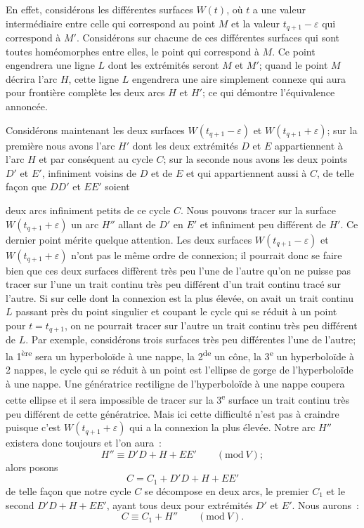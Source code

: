 \documentclass{article}
\begin{document}
En effet, considérons les différentes surfaces $W(t)$, où $t$ a une valeur intermédiaire entre celle qui correspond au point $M$ et la valeur $t_{q+1} - \varepsilon$ qui correspond à $M'$. Considérons sur chacune de ces différentes surfaces qui sont toutes homéomorphes entre elles, le point qui correspond à $M$. Ce point engendrera une ligne $L$ dont les extrémités seront $M$ et $M'$; quand le point $M$ décrira l'arc $H$, cette ligne $L$ engendrera une aire simplement connexe qui aura pour frontière complète les deux arcs $H$ et $H'$; ce qui démontre l'équivalence annoncée.

Considérons maintenant les deux surfaces $W(t_{q+1} - \varepsilon)$ et $W(t_{q+1} + \varepsilon)$; sur la première nous avons l'arc $H'$ dont les deux extrémités $D$ et $E$ appartiennent à l'arc $H$ et par conséquent au cycle $C$; sur la seconde nous avons les deux points $D'$ et $E'$, infiniment voisins de $D$ et de $E$ et qui appartiennent aussi à $C$, de telle façon que $DD'$ et $EE'$ soient

deux arcs infiniment petits de ce cycle $C$. Nous pouvons tracer sur la surface $W(t_{q+1} + \varepsilon)$ un arc $H''$ allant de $D'$ en $E'$ et infiniment peu différent de $H'$. Ce dernier point mérite quelque attention. Les deux surfaces $W(t_{q+1} - \varepsilon)$ et $W(t_{q+1} + \varepsilon)$ n'ont pas le même ordre de connexion; il pourrait donc se faire bien que ces deux surfaces diffèrent très peu l'une de l'autre qu'on ne puisse pas tracer sur l'une un trait continu très peu différent d'un trait continu tracé sur l'autre. Si sur celle dont la connexion est la plus élevée, on avait un trait continu $L$ passant près du point singulier et coupant le cycle qui se réduit à un point pour $t = t_{q+1}$, on ne pourrait tracer sur l'autre un trait continu très peu différent de $L$. Par exemple, considérons trois surfaces très peu différentes l'une de l'autre; la 1\textsuperscript{ère} sera un hyperboloïde à une nappe, la 2\textsuperscript{de} un cône, la 3\textsuperscript{e} un hyperboloïde à 2 nappes, le cycle qui se réduit à un point est l'ellipse de gorge de l'hyperboloïde à une nappe. Une génératrice rectiligne de l'hyperboloïde à une nappe coupera cette ellipse et il sera impossible de tracer sur la 3\textsuperscript{e} surface un trait continu très peu différent de cette génératrice. Mais ici cette difficulté n'est pas à craindre puisque c'est $W(t_{q+1} + \varepsilon)$ qui a la connexion la plus élevée. Notre arc $H''$ existera donc toujours et l'on aura~:
\[ H'' \equiv D'D + H + EE' \qquad (\text{mod}\ V); \]
alors posons
\[ C = C_{1} + D'D + H + EE' \]
de telle façon que notre cycle $C$ se décompose en deux arcs, le premier $C_{1}$ et le second $D'D + H + EE'$, ayant tous deux pour extrémités $D'$ et $E'$. Nous aurons~:
\[ C \equiv C_{1} + H'' \qquad (\text{mod}\ V). \]
\end{document}
